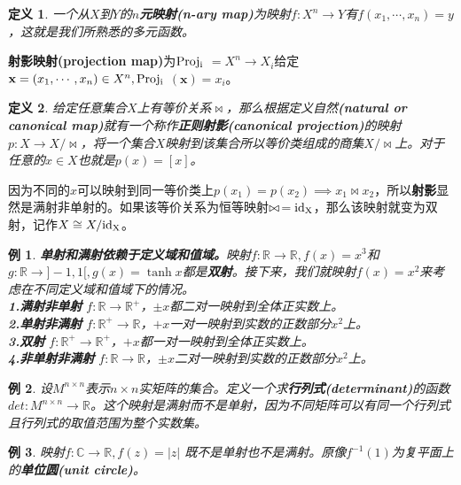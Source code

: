 \documentclass[mathserif,hyperref,UTF8,openany,b5paper]{ctexbook}
\newtheorem{exmp}{例}[section]
\newtheorem{defn}{定义}[section]
\begin{document}
\begin{defn}
一个从$X$到$Y$的\textbf{$n$元映射(n-ary map)}为映射$f:X^n \xrightarrow{} Y$有$f(x_1,\cdots ,x_n) = y$，这就是我们所熟悉的多元函数。
\end{defn}
\textbf{射影映射(projection map)}为$\rm Proj_i$ $= X^n \xrightarrow{} X_i$给定 $\mathbf{x}=(x_1,\cdots,x_n)\in X^n,\rm Proj_i$ $(\mathbf{x})=x_i$。
\begin{defn}
给定任意集合$X$上有等价关系$\bowtie$，那么根据定义自然\textbf{(natural or canonical  map)}就有一个称作\textbf{正则射影(canonical projection)}的映射$p:X \xrightarrow{} X/\bowtie$，将一个集合$X$映射到该集合所以等价类组成的商集$X/\bowtie$上。对于任意的$x\in X$也就是$p(x)=[x]$。
\end{defn}

因为不同的$x$可以映射到同一等价类上$p(x_1)=p(x_2)\implies x_1 \bowtie x_2$，所以\textbf{射影}显然是满射非单射的。如果该等价关系为恒等映射$\bowtie\, =\rm id_X$，那么该映射就变为双射，记作$X \cong X/\rm id_X$。

\begin{exmp}
\textbf{单射和满射依赖于定义域和值域。}映射$f:\mathbb{R} \xrightarrow{} \mathbb{R},f(x)=x^3$和$g:\mathbb{R} \xrightarrow{} ]-1,1[,g(x)=\tanh x$都是\textbf{双射}。接下来，我们就映射$f(x)=x^2$来考虑在不同定义域和值域下的情况。\\
\textbf{1.满射非单射} $f:\mathbb{R} \xrightarrow{} \mathbb{R}^+$，$\pm x$都二对一映射到全体正实数上。\\
\textbf{2.单射非满射} $f:\mathbb{R}^+ \xrightarrow{} \mathbb{R}$，$+ x$一对一映射到实数的正数部分$x^2$上。\\
\textbf{3.双射} $f:\mathbb{R}^+ \xrightarrow{} \mathbb{R}^+$，$+ x$都一对一映射到全体正实数上。\\
\textbf{4.非单射非满射} $f:\mathbb{R} \xrightarrow{} \mathbb{R}$，$\pm x$二对一映射到实数的正数部分$x^2$上。
\end{exmp}
\begin{exmp}
设$M^{n×n}$表示$n×n$实矩阵的集合。定义一个求\textbf{行列式(determinant)}的函数$det:
M^{n×n}\xrightarrow{} \mathbb{R}$。这个映射是满射而不是单射，因为不同矩阵可以有同一个行列式且行列式的取值范围为整个实数集。
\end{exmp}
\begin{exmp}
映射$f:\mathbb{C} \xrightarrow{} \mathbb{R},f(z)=|z|$ 既不是单射也不是满射。原像$f^{-1}(1)$为复平面上的\textbf{单位圆(unit circle)}。
\end{exmp}
\end{document}
